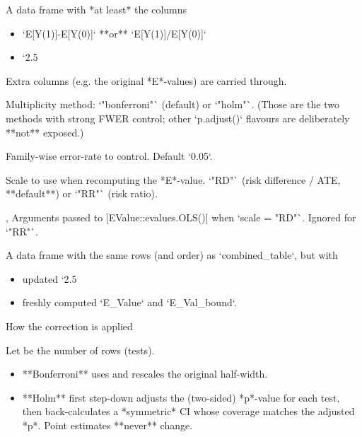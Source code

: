 \documentclass[a4paper]{book}
\begin{document}
\begin{Arguments}
\begin{ldescription}
\item[\code{combined\_table}] A data frame with *at least* the columns
\begin{itemize}

\item{} `E[Y(1)]-E[Y(0)]` **or** `E[Y(1)]/E[Y(0)]`
\item{} `2.5 

\end{itemize}

Extra columns (e.g. the original *E*-values) are carried through.

\item[\code{adjust}] Multiplicity method: `"bonferroni"` (default) or `"holm"`.
(Those are the two methods with strong FWER control; other
`p.adjust()` flavours are deliberately **not** exposed.)

\item[\code{alpha}] Family-wise error-rate to control. Default `0.05`.

\item[\code{scale}] Scale to use when recomputing the *E*-value.
`"RD"` (risk difference / ATE, **default**) or `"RR"` (risk ratio).

\item[\code{delta}, \code{sd}] Arguments passed to [EValue::evalues.OLS()] when
`scale = "RD"`.  Ignored for `"RR"`.
\end{ldescription}
\end{Arguments}
%
\begin{Value}
A data frame with the same rows (and order) as `combined\_table`, but
with
\begin{itemize}

\item{} updated `2.5 
\item{} freshly computed `E\_Value` and `E\_Val\_bound`.

\end{itemize}

\end{Value}
%
\begin{Section}{How the correction is applied}

Let  be the number of rows (tests).
\begin{itemize}

\item{} **Bonferroni** uses
and rescales the original half-width.
\item{} **Holm** first step-down adjusts the (two-sided) *p*-value for each
test, then back-calculates a *symmetric* CI whose coverage matches the
adjusted *p*.  Point estimates **never** change.

\end{itemize}

\end{Section}
\end{document}
